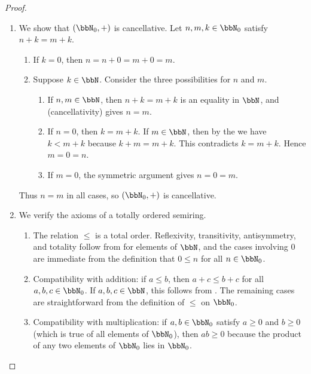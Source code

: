 \begin{proof}
\begin{enumerate}
        \item We show that $(\bbN_0, +)$ is cancellative. Let $n, m, k \in \bbN_0$ satisfy $n + k = m + k$.
        \begin{enumerate}
            \item If $k = 0$, then $n = n + 0 = m + 0 = m$.
            \item Suppose $k \in \bbN$. Consider the three possibilities for $n$ and $m$.
            \begin{enumerate}
                \item If $n, m \in \bbN$, then $n + k = m + k$ is an equality in $\bbN$, and  (cancellativity) gives $n = m$.
                \item If $n = 0$, then $k = m + k$. If $m \in \bbN$, then by the  we have $k < m + k$ because $k + m = m + k$. This contradicts $k = m + k$. Hence $m = 0 = n$.
                \item If $m = 0$, the symmetric argument gives $n = 0 = m$.
            \end{enumerate}
        \end{enumerate}
        Thus $n = m$ in all cases, so $(\bbN_0, +)$ is cancellative.

        \item We verify the axioms of a totally ordered semiring.
        \begin{enumerate}
            \item The relation $\leq$ is a total order. Reflexivity, transitivity, antisymmetry, and totality follow from  for elements of $\bbN$, and the cases involving $0$ are immediate from the definition that $0 \leq n$ for all $n \in \bbN_0$.
            \item Compatibility with addition: if $a \leq b$, then $a + c \leq b + c$ for all $a, b, c \in \bbN_0$. If $a, b, c \in \bbN$, this follows from . The remaining cases are straightforward from the definition of $\leq$ on $\bbN_0$.
            \item Compatibility with multiplication: if $a, b \in \bbN_0$ satisfy $a \geq 0$ and $b \geq 0$ (which is true of all elements of $\bbN_0$), then $a b \geq 0$ because the product of any two elements of $\bbN_0$ lies in $\bbN_0$.
        \end{enumerate}
    \end{enumerate}
\end{proof}